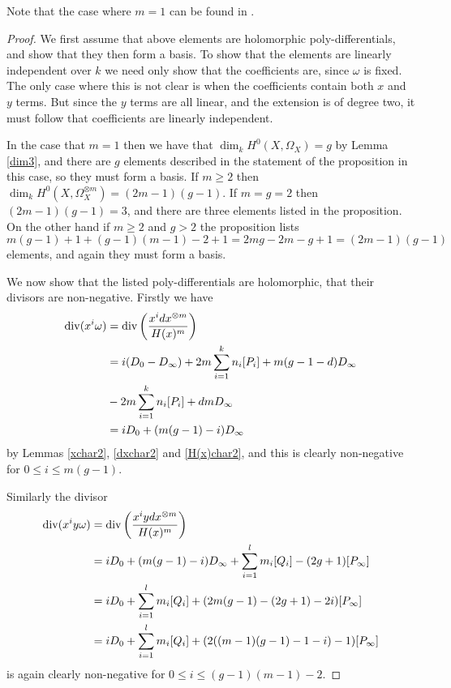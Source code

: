     \begin{rem}
    Note that the case where $m=1$ can be found in \cite[Prop. 7.4.26]{liu}.
    \end{rem}

    \begin{proof}
    We first assume that above elements are holomorphic poly-differentials, and show that they then form a basis.
    To show that the elements are linearly independent over $k$ we need only show that the coefficients are, since $\omega$ is fixed.
    The only case where this is not clear is when the coefficients contain both $x$ and $y$ terms.
    But since the $y$ terms are all linear, and the extension is of degree two, it must follow that coefficients are linearly independent.
    
    
    In the case that $m=1$ then we have that $\dim_k H^0(X,\Omega_X) =g$ by Lemma \ref{dim3}, and there are $g$ elements described in the statement of the proposition in this case, so they must form a basis.
    If $m \geq 2$ then $\dim_k H^0(X,\Omega_X^{\otimes m}) = (2m-1)(g-1)$.
    If $m=g=2$ then $(2m-1)(g-1) = 3$, and there are three elements listed in the proposition.
    On the other hand if $m\geq 2$ and $g > 2$ the proposition lists
        \[
        m(g-1)+1 + (g-1)(m-1)-2+1 = 2mg -2m -g +1 = (2m-1)(g-1)
        \]
    elements, and again they must form a basis.
    
    We now show that the listed poly-differentials are holomorphic, \ie that their divisors are non-negative.
    Firstly we have
        \begin{align*}
        \operatorname{div}(x^i\omega) & =  \operatorname{div} \left( \frac{x^i dx^{\otimes m}}{H(x)^m} \right)\\ 
        & =  i(D_0 - D_\infty) +2m\sum_{i=1}^k n_i[P_i] + m(g-1-d)D_\infty\\
        &  -2m\sum_{i=1}^k n_i [P_i] + dmD_\infty \\
        & =  iD_0 + (m(g-1) -i)D_\infty
        \end{align*}
    by Lemmas \ref{xchar2}, \ref{dxchar2} and \ref{H(x)char2}, and this is clearly non-negative for $0\leq i \leq m(g-1)$.
    
    Similarly the divisor 
        \begin{align*}
        \operatorname{div}(x^iy\omega) & =  \operatorname{div} \left( \frac{x^i ydx^{\otimes m}}{H(x)^m} \right)\\ 
        & =  iD_0 + (m(g-1) -i)D_\infty + \sum_{i=1}^l m_i[Q_i] - (2g+1)[P_\infty] \\
        & =  iD_0 +  \sum_{i=1}^l m_i[Q_i] + (2m(g-1) -(2g+1) -2i)[P_\infty] \\
        & =  iD_0 +  \sum_{i=1}^l m_i[Q_i] + (2((m-1)(g-1) -1 -i)-1)[P_\infty]
        \end{align*}
    is again clearly non-negative for $0 \leq i \leq (g-1)(m-1)-2$.
    
    \end{proof}



